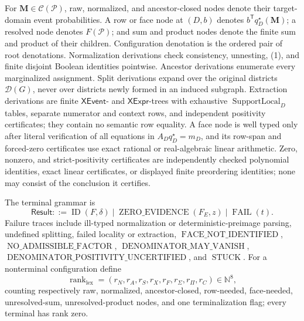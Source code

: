 For \(\mathbf M\in\mathcal C(\mathcal P)\), raw, normalized, and ancestor-closed nodes denote their target-domain event probabilities.  A row or face node at \((D,b)\) denotes \(b^{\mathsf T}q_D^\star(\mathbf M)\); a resolved node denotes \(F(\mathcal P)\); and sum and product nodes denote the finite sum and product of their children.  Configuration denotation is the ordered pair of root denotations.  Normalization derivations check consistency, unnesting, (1), and finite disjoint Boolean identities pointwise.  Ancestor derivations enumerate every marginalized assignment.  Split derivations expand over the original districts \(\mathcal D(G)\), never over districts newly formed in an induced subgraph.  Extraction derivations are finite \(\mathsf{XEvent}\)- and \(\mathsf{XExpr}\)-trees with exhaustive \(\operatorname{SupportLocal}_D\) tables, separate numerator and context rows, and independent positivity certificates; they contain no semantic row equality.  A face node is well typed only after literal verification of all equations in \(A_Dq_D^\star=m_D\), and its row-span and forced-zero certificates use exact rational or real-algebraic linear arithmetic.  Zero, nonzero, and strict-positivity certificates are independently checked polynomial identities, exact linear certificates, or displayed finite preordering identities; none may consist of the conclusion it certifies.

The terminal grammar is
\[
\mathsf{Result}::=\operatorname{ID}(F,\delta)
\mid\operatorname{ZERO\_EVIDENCE}(F_E,z)
\mid\operatorname{FAIL}(t).
\]
Failure traces include ill-typed normalization or deterministic-preimage parsing, undefined splitting, failed locality or extraction, \(\operatorname{FACE\_NOT\_IDENTIFIED}\), \(\operatorname{NO\_ADMISSIBLE\_FACTOR}\), \(\operatorname{DENOMINATOR\_MAY\_VANISH}\), \(\operatorname{DENOMINATOR\_POSITIVITY\_UNCERTIFIED}\), and \(\operatorname{STUCK}\).  For a nonterminal configuration define
\[
\operatorname{rank}_{\mathrm{lex}}
=(r_N,r_A,r_S,r_X,r_F,r_{\Sigma},r_{\Pi},r_C)\in\mathbb N^8,
\]
counting respectively raw, normalized, ancestor-closed, row-needed, face-needed, unresolved-sum, unresolved-product nodes, and one terminalization flag; every terminal has rank zero.